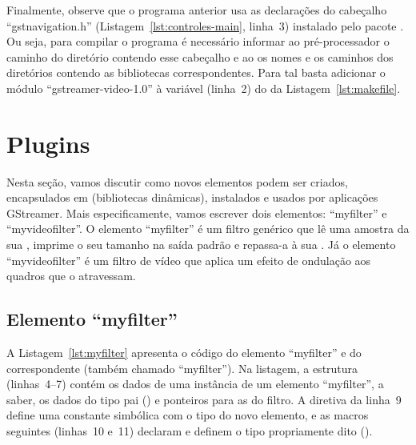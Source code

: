 \documentclass{SBCbookchapter}
\begin{document}


Finalmente, observe que o programa anterior usa as declarações do cabeçalho
``gstnavigation.h'' (Listagem~\ref{lst:controles-main}, linha~3) instalado
pelo pacote .  Ou seja, para compilar o programa é
necessário informar ao pré-processador o caminho do diretório contendo esse
cabeçalho e ao  os nomes e os caminhos dos diretórios contendo as
bibliotecas correspondentes.  Para tal basta adicionar o módulo
``gstreamer-video-1.0'' à variável  (linha~2) do  da
Listagem~\ref{lst:makefile}.


\section{Plugins}
\label{sec:plugins}

Nesta seção, vamos discutir como novos elementos podem ser criados,
encapsulados em  (bibliotecas dinâmicas), instalados e usados
por aplicações GStreamer.  Mais especificamente, vamos escrever dois
elementos: ``myfilter'' e ``myvideofilter''.  O elemento ``myfilter'' é um
filtro genérico que lê uma amostra da sua , imprime o seu
tamanho na saída padrão e repassa-a à sua .  Já o elemento
``myvideofilter'' é um filtro de vídeo que aplica um efeito de ondulação aos
quadros que o atravessam.


\subsection*{Elemento ``myfilter''}

A Listagem~\ref{lst:myfilter} apresenta o código do elemento ``myfilter'' e
do  correspondente (também chamado ``myfilter'').  Na listagem, a
estrutura  (linhas~4--7) contém os dados de uma instância de
um elemento ``myfilter'', a saber, os dados do tipo pai () e
ponteiros para as  do filtro.  A diretiva da linha~9 define uma
constante simbólica com o tipo do novo elemento, e as macros seguintes
(linhas~10 e~11) declaram e definem o tipo propriamente dito
().


\clearpage
\end{document}
